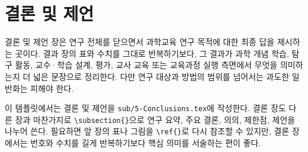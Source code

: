 \section{결론 및 제언}

%
%
%
%
%

결론 및 제언 장은 연구 전체를 닫으면서 과학교육 연구 목적에 대한 최종 답을 제시하는 곳이다.
결과 장의 표와 수치를 그대로 반복하기보다, 그 결과가 과학 개념 학습, 탐구 활동, 교수·학습 설계, 평가, 교사 교육 또는 교육과정 실행 측면에서 무엇을 의미하는지 더 넓은 문장으로 정리한다.
다만 연구 대상과 방법의 범위를 넘어서는 과도한 일반화는 피해야 한다.

이 템플릿에서는 결론 및 제언을 \verb|sub/5-Conclusions.tex|에 작성한다.
결론 장도 다른 장과 마찬가지로 \verb|\subsection{}|으로 연구 요약, 주요 결론, 의의, 제한점, 제언을 나누어 쓴다.
필요하면 앞 장의 표나 그림을 \verb|\ref{}|로 다시 참조할 수 있지만, 결론 장에서는 번호와 수치를 길게 반복하기보다 핵심 의미를 서술하는 편이 좋다.

